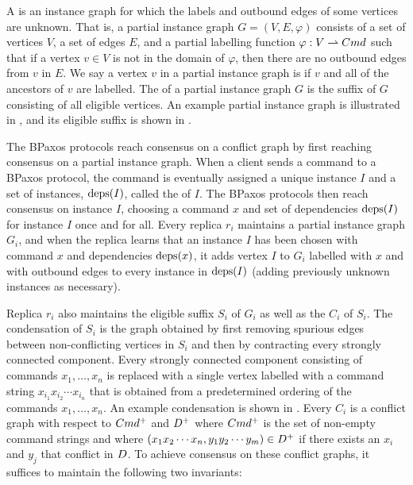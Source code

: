 A  is an instance graph for which the labels
and outbound edges of some vertices are unknown. That is, a partial instance
graph $G = (V, E, \varphi)$ consists of a set of vertices $V$, a set of edges
$E$, and a partial labelling function $\varphi: V \rightharpoonup Cmd$ such that if
a vertex $v \in V$ is not in the domain of $\varphi$, then there are no
outbound edges from $v$ in $E$.
%
We say a vertex $v$ in a partial instance graph is  if $v$
and all of the ancestors of $v$ are labelled. The  of
a partial instance graph $G$ is the suffix of $G$ consisting of all eligible
vertices.
%
An example partial instance graph is illustrated in
, and its eligible suffix is shown in
.

{}

The BPaxos protocols reach consensus on a conflict graph by first reaching
consensus on a partial instance graph. When a client sends a command to a
BPaxos protocol, the command is eventually assigned a unique instance $I$ and a
set of instances, $\text{deps}(I)$, called the  of $I$. The
BPaxos protocols then reach consensus on instance $I$, choosing a command $x$
and set of dependencies $\text{deps}(I)$ for instance $I$ once and for all. Every
replica $r_i$ maintains a partial instance graph $G_i$, and when the replica
learns that an instance $I$ has been chosen with command $x$ and dependencies
$\text{deps}(x)$, it adds vertex $I$ to $G_i$ labelled with $x$ and with outbound
edges to every instance in $\text{deps}(I)$ (adding previously unknown instances as
necessary).

Replica $r_i$ also maintains the eligible suffix $S_i$ of $G_i$ as well as the
 $C_i$ of $S_i$. The condensation of $S_i$ is the graph
obtained by first removing spurious edges between non-conflicting vertices in
$S_i$ and then by contracting every strongly connected component. Every
strongly connected component consisting of commands $x_1, \ldots, x_n$ is
replaced with a single vertex labelled with a command string $x_{i_1} x_{i_2}
\cdots x_{i_n}$ that is obtained from a predetermined ordering of the commands
$x_1, \ldots, x_n$. An example condensation is shown in .
%
Every $C_i$ is a conflict graph with respect to $Cmd^+$ and $D^+$
where $Cmd^+$ is the set of non-empty command strings and where $(x_1 x_2
\cdots x_n, y_1 y_2 \cdots y_m) \in D^+$ if there exists an $x_i$ and
$y_j$ that conflict in $D$. To achieve consensus on these conflict
graphs, it suffices to maintain the following two invariants:

